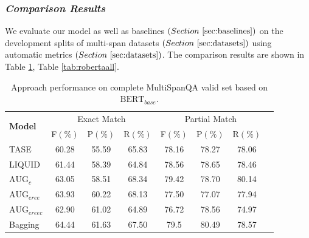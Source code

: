 \documentclass[a4paper,fleqn,twocolumn]{cas-dc}
\newcommand{\1}[1]{\mathds{1}\left[#1\right]}
\begin{document}
	\subsubsection{\textit{Comparison Results}}
	We evaluate our model as well as baselines 
	\(( Section ~\ref{sec:baselines} )\) on the development splits of multi-span datasets \(( Section  ~\ref{sec:datasets})\) using automatic metrics \(( Section ~\ref{sec:datasets})\). The comparison results are shown in Table \ref{tab:bertall}, Table \ref{tab:robertaall}.
	
	\begin{table}[width=\textwidth,cols=9,pos=h]  %
		\caption{Approach performance on complete MultiSpanQA valid set based on $\text{BERT}_{base}$.} 
		\label{tab:bertall}
		\begin{tabular*}{\textwidth}{@{\extracolsep{\fill}}lccccccc}
			\toprule
			\multirow{2}{*}{\textbf{Model}} & \multicolumn{3}{c}{Exact Match} & \multicolumn{3}{c}{Partial Match}  \\
			\cline{2-7} 
			\addlinespace
			& F\((\%)\) & P\((\%)\) & R\((\%)\) & F\((\%)\) & P\((\%)\) & R\((\%)\) \\
			\midrule
			TASE   & 60.28 & 55.59 & 65.83 & 78.16 & 78.27 & 78.06 \\ 
			LIQUID & 61.44 & 58.39 & 64.84 & 78.56 & 78.65 & 78.46 \\
			$\text{AUG}_{c}$ & 63.05 & 58.51 & 68.34 & 79.42 & 78.70 & 80.14 \\
			$\text{AUG}_{eree}$  & 63.93 & 60.22 & 68.13 & 77.50 & 77.07 & 77.94 \\
			$\text{AUG}_{ereec}$ & 62.90  & 61.02 & 64.89 & 76.72 & 78.56 & 74.97 \\
			Bagging & 64.44 & 61.63 & 67.50 & 79.5 & 80.49 & 78.57 \\
			\bottomrule
		\end{tabular*}
	\end{table}
	
\end{document}
